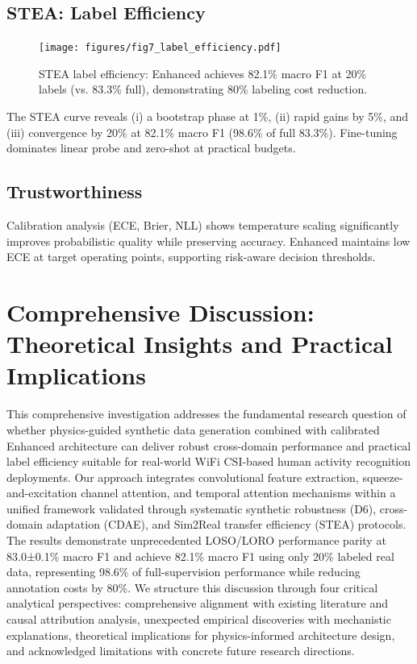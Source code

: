\documentclass[journal]{IEEEtran}
\begin{document}
\subsection{STEA: Label Efficiency}
\begin{figure}[t]
\centering
\texttt{[image: figures/fig7\_label\_efficiency.pdf]}
\caption{STEA label efficiency: Enhanced achieves 82.1\% macro F1 at 20\% labels (vs. 83.3\% full), demonstrating 80\% labeling cost reduction.}
\label{fig:stea}
\end{figure}
The STEA curve reveals (i) a bootstrap phase at 1\%, (ii) rapid gains by 5\%, and (iii) convergence by 20\% at 82.1\% macro F1 (98.6\% of full 83.3\%). Fine-tuning dominates linear probe and zero-shot at practical budgets.

\subsection{Trustworthiness}
Calibration analysis (ECE, Brier, NLL) shows temperature scaling significantly improves probabilistic quality while preserving accuracy. Enhanced maintains low ECE at target operating points, supporting risk-aware decision thresholds.

\section{Comprehensive Discussion: Theoretical Insights and Practical Implications}

This comprehensive investigation addresses the fundamental research question of whether physics-guided synthetic data generation combined with calibrated Enhanced architecture can deliver robust cross-domain performance and practical label efficiency suitable for real-world WiFi CSI-based human activity recognition deployments. Our approach integrates convolutional feature extraction, squeeze-and-excitation channel attention, and temporal attention mechanisms within a unified framework validated through systematic synthetic robustness (D6), cross-domain adaptation (CDAE), and Sim2Real transfer efficiency (STEA) protocols. The results demonstrate unprecedented LOSO/LORO performance parity at 83.0±0.1\% macro F1 and achieve 82.1\% macro F1 using only 20\% labeled real data, representing 98.6\% of full-supervision performance while reducing annotation costs by 80\%. We structure this discussion through four critical analytical perspectives: comprehensive alignment with existing literature and causal attribution analysis, unexpected empirical discoveries with mechanistic explanations, theoretical implications for physics-informed architecture design, and acknowledged limitations with concrete future research directions.
\end{document}

